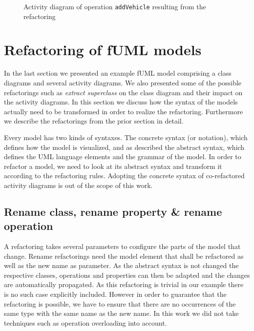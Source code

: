 \documentclass{llncs}
\begin{document}
\begin{figure}[h!t]
 \centering
 \caption{Activity diagram of operation \texttt{addVehicle} resulting from the refactoring}
 \label{fig:addCarRef}
\end{figure}

\clearpage
\section{Refactoring of fUML models}
\label{sec:fuml-refactoring}

In the last section we presented an example fUML model comprising a class diagrams and several activity diagrams. We also presented some of the possible 
refactorings such as \textit{extract superclass} on the class diagram and their impact on the activity diagrams. In this 
section we discuss how the syntax of the models actually need to be transformed in order to realize the refactoring. Furthermore we describe 
the refactorings from the prior section in detail.

Every model has two kinds of syntaxes. The concrete syntax (or notation), which defines how the model is visualized, and as described the abstract
syntax, which defines the UML language elements and the grammar of the model. In order to refactor a model, we need to look 
at its abstract syntax and transform it according to the refactoring rules. Adopting the concrete syntax of co-refactored activity diagrams 
is out of the scope of this work.

\subsection{Rename class, rename property \& rename operation}
\label{sec:renames}
A refactoring takes several parameters to configure the parts of the model that change. Rename 
refactorings need the model element that shall be refactored as well as the new name as parameter. As the abstract syntax 
is not changed the respective classes, operations and properties can then be adapted 
and the changes are automatically propagated. As this refactoring is trivial in our example there is no such case explicitly 
included. However in order to guarantee that the 
refactoring is possible, we have to ensure that there are no occurrences of the same type with the same name as the 
new name. In this work we did not take techniques such as operation overloading into account.
\end{document}
